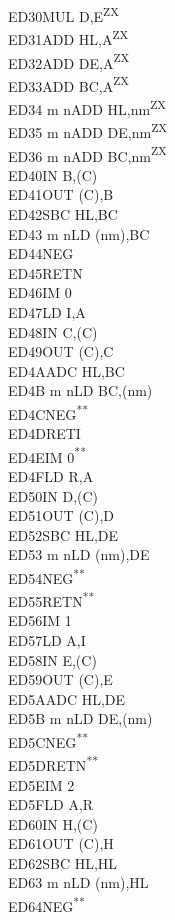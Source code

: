 \documentclass[12pt,twoside,openright,a4paper]{book}
\newcommand{\UNDOC}{\textnormal{\textsuperscript{**}}}
\newcommand{\ZXN}{\textnormal{\textsuperscript{ZX}}}
\begin{document}
\begin{multicols}{3}
{\begin{tabbing}
	ED30\>MUL D,E\ZXN\\
	ED31\>ADD HL,A\ZXN\\
	ED32\>ADD DE,A\ZXN\\
	ED33\>ADD BC,A\ZXN\\
	ED34 m n\>ADD HL,nm\ZXN\\
	ED35 m n\>ADD DE,nm\ZXN\\
	ED36 m n\>ADD BC,nm\ZXN\\
	ED40\>IN B,(C)\\
	ED41\>OUT (C),B\\
	ED42\>SBC HL,BC\\
	ED43 m n\>LD (nm),BC\\
	ED44\>NEG\\
	ED45\>RETN\\
	ED46\>IM 0\\
	ED47\>LD I,A\\
	ED48\>IN C,(C)\\
	ED49\>OUT (C),C\\
	ED4A\>ADC HL,BC\\
	ED4B m n\>LD BC,(nm)\\
	ED4C\>NEG\UNDOC\\
	ED4D\>RETI\\
	ED4E\>IM 0\UNDOC\\
	ED4F\>LD R,A\\
	ED50\>IN D,(C)\\
	ED51\>OUT (C),D\\
	ED52\>SBC HL,DE\\
	ED53 m n\>LD (nm),DE\\
	ED54\>NEG\UNDOC\\
	ED55\>RETN\UNDOC\\
	ED56\>IM 1\\
	ED57\>LD A,I\\
	ED58\>IN E,(C)\\
	ED59\>OUT (C),E\\
	ED5A\>ADC HL,DE\\
	ED5B m n\>LD DE,(nm)\\
	ED5C\>NEG\UNDOC\\
	ED5D\>RETN\UNDOC\\
	ED5E\>IM 2\\
	ED5F\>LD A,R\\
	ED60\>IN H,(C)\\
	ED61\>OUT (C),H\\
	ED62\>SBC HL,HL\\
	ED63 m n\>LD (nm),HL\\
	ED64\>NEG\UNDOC\\

\end{tabbing}}
\end{multicols}
\end{document}
